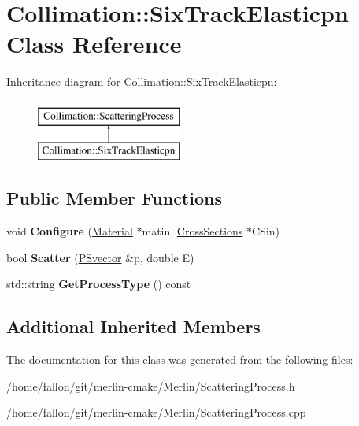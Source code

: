 \hypertarget{classCollimation_1_1SixTrackElasticpn}{}\section{Collimation\+:\+:Six\+Track\+Elasticpn Class Reference}
\label{classCollimation_1_1SixTrackElasticpn}
Inheritance diagram for Collimation\+:\+:Six\+Track\+Elasticpn\+:\begin{figure}[H]
\begin{center}
\leavevmode
\includegraphics[height=2.000000cm]{classCollimation_1_1SixTrackElasticpn}
\end{center}
\end{figure}
\subsection*{Public Member Functions}
\begin{DoxyCompactItemize}
\item 
\mbox{\label{classCollimation_1_1SixTrackElasticpn_a161839a9da1c92eb416e6693ca984f0b}} 
void {\bfseries Configure} (\hyperlink{classMaterial}{Material} $\ast$matin, \hyperlink{classCollimation_1_1CrossSections}{Cross\+Sections} $\ast$C\+Sin)
\item 
\mbox{\label{classCollimation_1_1SixTrackElasticpn_abd166e5a119a8c80985b72a44e9475e1}} 
bool {\bfseries Scatter} (\hyperlink{classPSvector}{P\+Svector} \&p, double E)
\item 
\mbox{\label{classCollimation_1_1SixTrackElasticpn_a4e4c327baa661bec0f06e18e3dd9d0b9}} 
std\+::string {\bfseries Get\+Process\+Type} () const
\end{DoxyCompactItemize}
\subsection*{Additional Inherited Members}


The documentation for this class was generated from the following files\+:\begin{DoxyCompactItemize}
\item 
/home/fallon/git/merlin-\/cmake/\+Merlin/Scattering\+Process.\+h\item 
/home/fallon/git/merlin-\/cmake/\+Merlin/Scattering\+Process.\+cpp\end{DoxyCompactItemize}
